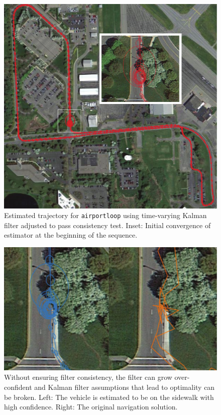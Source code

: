 \begin{figure}[!bthp]
\includegraphics[width=\columnwidth]{airportloop_map}
\caption{Estimated trajectory for \texttt{airportloop} using time-varying Kalman filter adjusted to pass consistency test.  Inset: Initial convergence of estimator at the beginning of the sequence.}
\label{fig:airportloop_map}
\end{figure} 

\begin{figure}
\includegraphics[width=\columnwidth]{airportloop_map_bad}
\caption{Without ensuring filter consistency, the filter can grow over-confident and Kalman filter assumptions that lead to optimality can be broken.  Left: The vehicle is estimated to be on the sidewalk with high confidence.  Right: The original navigation solution.}
\label{fig:airportloop_map_bad}
\end{figure}

